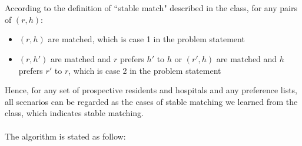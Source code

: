 \documentclass[12pt]{article}
\begin{document}
\setlength{\parindent}{0in}
\addtolength{\parskip}{0.1cm}
\setlength{\fboxrule}{.5mm}\setlength{\fboxsep}{1.2mm}
\newlength{\boxlength}\setlength{\boxlength}{\textwidth}
\addtolength{\boxlength}{-4mm}
\begin{center}
\end{center}
\vspace{5mm}

\section{}
According to the definition of ``stable match" described in the class, for any pairs of $(r,h)$:\\
\begin{itemize}
	\item $(r,h)$ are matched, which is case 1 in the problem statement
	\item $(r,h')$ are matched and $r$ prefers $h'$ to $h$ or $(r',h)$ are matched and $h$ prefers $r'$ to $r$, which is case 2 in the problem statement
\end{itemize}
Hence, for any set of prospective residents and hospitals and any preference lists, all scenarios can be regarded as the cases of stable matching we learned from the class, which indicates stable matching.\\\\
The algorithm is stated as follow:
\end{document}
